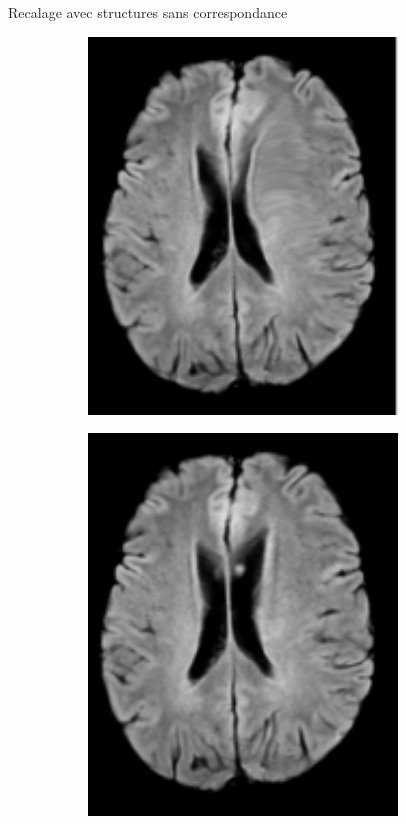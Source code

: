 \documentclass[10pt]{beamer}
\begin{document}
\begin{frame}{Recalage avec structures sans correspondance}
\begin{figure}[ht]
\begin{subfigure}[t]{0.33\textwidth}
    \centering \includegraphics[width=0.9\textwidth]{fig/parisot_1}
    \caption{}
    \label{subfig:parisot_1}
  \end{subfigure}%
  \begin{subfigure}[t]{0.33\textwidth}
    \centering \includegraphics[width=0.9\textwidth]{fig/parisot_2}
    \caption{}
    \label{subfig:parisot_2}
  \end{subfigure}%
\end{figure}
  
\end{frame}
\end{document}
